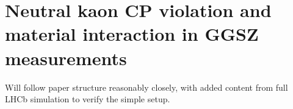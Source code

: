

\chapter{Neutral kaon CP violation and material interaction in GGSZ measurements}
\label{ch:4-KS-CPV}

Will follow paper structure reasonably closely, with added content from full LHCb simulation to verify the simple setup.






